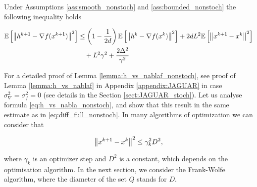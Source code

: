         \begin{lemma}
        \label{lemma:h_vs_nablaf_nonstoch}
            Under Assumptions \ref{ass:smooth_nonstoch} and \ref{ass:bounded_nonstoch} the following inequality holds
            
            \begin{equation}
            \label{eq:h_vs_nabla_nonstoch}
            \begin{split}
            \mathbb{E}\left[ \left\| h^{k+1} - \nabla f(x^{k+1}) \right\|^2 \right]
                    &\leq
                    \left(1 - \frac{1}{2 d}\right) \mathbb{E}\left[ \left\| h^{k} - \nabla f(x^{k}) \right\|^2 \right]
                    + 2d L^2 \mathbb{E}\left[ \left\| x^{k+1} - x^{k} \right\|^2 \right]
                    \\&\quad+ L^2 \gamma^2 
                    + \frac{2 \Delta^2}{\gamma^2}
            \end{split}
            \end{equation}
        
        \end{lemma}
    
        For a detailed proof of Lemma \ref{lemma:h_vs_nablaf_nonstoch}, see proof of Lemma \ref{lemma:h_vs_nablaf} in Appendix \ref{appendix:JAGUAR} in case $\sigma_\nabla^2 = \sigma_f^2 = 0$ (see details in the Section \ref{sect:JAGUAR_stoch}).
        Let us analyse formula \eqref{eq:h_vs_nabla_nonstoch}, and show that this result in the same estimate as in \eqref{eq:diff_full_nonstoch}. In many algorithms of optimization we can consider that 
        
        \begin{equation}
        \label{eq:ass_D}
            \left\| x^{k+1} - x^k \right\|^2 \leq \gamma_k^2 D^2,
        \end{equation}
    
        where $\gamma_k$ is an optimizer step and $D^2$ is a constant, which depends on the optimisation algorithm. In the next section, we consider the Frank-Wolfe algorithm, where the diameter of the set $Q$ stands for $D$. 

